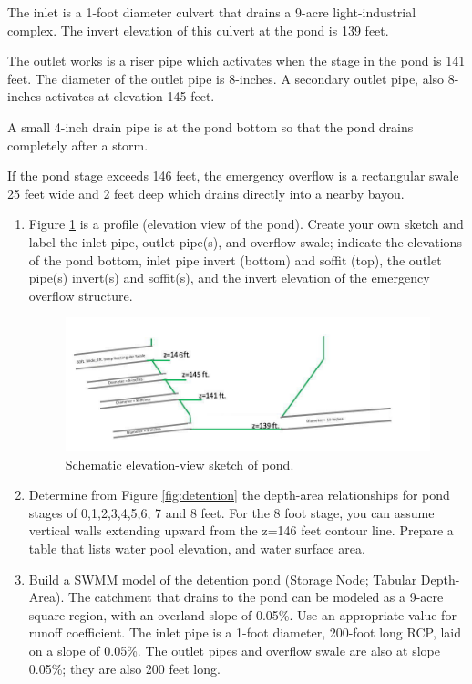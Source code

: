 \documentclass[12pt]{article}
\begin{document}
The inlet is a 1-foot diameter culvert that drains a 9-acre light-industrial complex.   
The invert elevation of this culvert at the pond is 139 feet.

The outlet works is a riser pipe which activates when the stage in the pond is 141 feet.
The diameter of the outlet pipe is 8-inches.
A secondary outlet pipe, also 8-inches activates at elevation 145 feet.

A small 4-inch drain pipe is at the pond bottom so that the pond drains completely after a storm.

If the pond stage exceeds 146 feet, the emergency overflow is a rectangular swale 25 feet wide and 2 feet deep which drains directly into a nearby bayou.

\begin{enumerate}
\item Figure \ref{fig:side-view} is a profile (elevation view of the pond).  Create your own sketch and label the inlet pipe, outlet pipe(s), and overflow swale; indicate the elevations of the pond bottom, inlet pipe invert (bottom) and soffit (top), the outlet pipe(s) invert(s) and soffit(s), and the invert elevation of the emergency overflow structure.
\begin{figure}[h!] %
   \centering
   \includegraphics[width=6in]{side-view.jpg} 
   \caption{Schematic elevation-view sketch of pond.}
   \label{fig:side-view}
\end{figure}
\item Determine from Figure \ref{fig:detention} the depth-area relationships for pond stages of 0,1,2,3,4,5,6, 7 and 8 feet.   For the 8 foot stage, you can assume vertical walls extending upward from the z=146 feet contour line.   Prepare a table that lists water pool elevation, and water surface area.  
\item Build a SWMM model of the detention pond (Storage Node; Tabular Depth-Area).   
The catchment that drains to the pond can be modeled as a 9-acre square region, with an overland slope of 0.05\%.
Use an appropriate value for runoff coefficient.   
The inlet pipe is a 1-foot diameter, 200-foot long RCP, laid on a slope of 0.05\%.
The outlet pipes and overflow swale are also at slope 0.05\%; they are also 200 feet long.


\end{enumerate}
\end{document}
